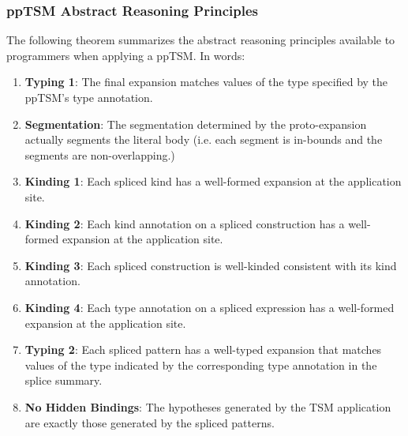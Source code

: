 \subsubsection{ppTSM Abstract Reasoning Principles}
The following theorem summarizes the abstract reasoning principles available to programmers when applying a ppTSM. In words:
\begin{enumerate}
	  \item \textbf{Typing 1}: The final expansion matches values of the type specified by the ppTSM's type annotation.
	\item \textbf{Segmentation}: The segmentation determined by the proto-expansion actually segments the literal body (i.e. each segment is in-bounds and the segments are non-overlapping.)
	\item \textbf{Kinding 1}: Each spliced kind has a well-formed expansion at the application site.
	\item \textbf{Kinding 2}: Each kind annotation on a spliced construction has a well-formed expansion at the application site.
	\item \textbf{Kinding 3}: Each spliced construction is well-kinded consistent with its kind annotation.
	\item \textbf{Kinding 4}: Each type annotation on a spliced expression has a well-formed expansion at the application site.
	\item \textbf{Typing 2}: Each spliced pattern has a well-typed expansion that matches values of the type indicated by the corresponding type annotation in the splice summary.
	  \item \textbf{No Hidden Bindings}: The hypotheses generated by the TSM application are exactly those generated by the spliced patterns.
\end{enumerate}
\begingroup
\def\thetheorem{\ref{thm:pptsm-abstract-reasoning-principles}}

